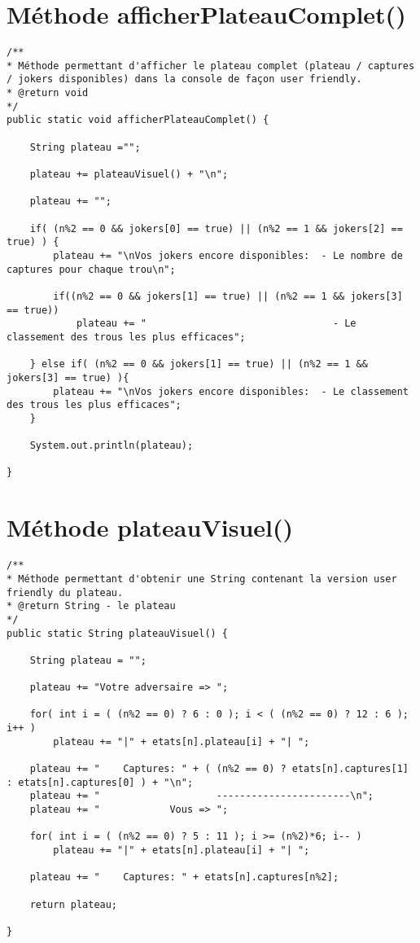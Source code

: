 \documentclass[11pt,a4paper]{report}
\begin{document}
    \section{Méthode afficherPlateauComplet()}
        \begin{lstlisting}
/**
* Méthode permettant d'afficher le plateau complet (plateau / captures / jokers disponibles) dans la console de façon user friendly.
* @return void
*/
public static void afficherPlateauComplet() {

    String plateau ="";

    plateau += plateauVisuel() + "\n";

    plateau += "";      

    if( (n%2 == 0 && jokers[0] == true) || (n%2 == 1 && jokers[2] == true) ) {
        plateau += "\nVos jokers encore disponibles:  - Le nombre de captures pour chaque trou\n";

        if((n%2 == 0 && jokers[1] == true) || (n%2 == 1 && jokers[3] == true))
            plateau += "                                - Le classement des trous les plus efficaces";

    } else if( (n%2 == 0 && jokers[1] == true) || (n%2 == 1 && jokers[3] == true) ){
        plateau += "\nVos jokers encore disponibles:  - Le classement des trous les plus efficaces";
    }

    System.out.println(plateau);

}
        \end{lstlisting}

        \newpage

    \section{Méthode plateauVisuel()}
        \begin{lstlisting}
/**
* Méthode permettant d'obtenir une String contenant la version user friendly du plateau.
* @return String - le plateau
*/
public static String plateauVisuel() {

    String plateau = "";

    plateau += "Votre adversaire => ";

    for( int i = ( (n%2 == 0) ? 6 : 0 ); i < ( (n%2 == 0) ? 12 : 6 ); i++ )
        plateau += "|" + etats[n].plateau[i] + "| ";

    plateau += "    Captures: " + ( (n%2 == 0) ? etats[n].captures[1] : etats[n].captures[0] ) + "\n";
    plateau += "                    -----------------------\n";
    plateau += "            Vous => ";

    for( int i = ( (n%2 == 0) ? 5 : 11 ); i >= (n%2)*6; i-- )
        plateau += "|" + etats[n].plateau[i] + "| ";

    plateau += "    Captures: " + etats[n].captures[n%2];

    return plateau;

}
        \end{lstlisting}
\end{document}
